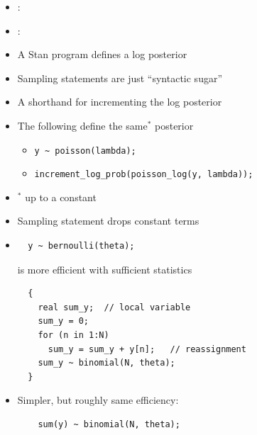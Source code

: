\documentclass[10pt]{report}
\begin{document}
%
\begin{itemize}
\item {}: \ {\footnotesize {}}
\item {}:
\ {\footnotesize
    }
\end{itemize}


%
\begin{itemize}
\item A Stan program defines a log posterior
\item Sampling statements are just ``syntactic sugar''
\item A shorthand for incrementing the log posterior
\item The following define the same$^*$ posterior
\begin{itemize}
\item \Verb|y ~ poisson(lambda);|
\item \Verb|increment_log_prob(poisson_log(y, lambda));|
\end{itemize}
\item ${}^{*}$ up to a constant
\item Sampling statement drops constant terms
\end{itemize}



%
\begin{itemize}
\item
\begin{Verbatim}
  y ~ bernoulli(theta);
\end{Verbatim}
is more efficient with sufficient statistics
{\small
\begin{Verbatim}
  {
    real sum_y;  // local variable
    sum_y = 0;
    for (n in 1:N)
      sum_y = sum_y + y[n];   // reassignment
    sum_y ~ binomial(N, theta);
  }
\end{Verbatim}
}
\item Simpler, but roughly same efficiency:
\begin{Verbatim}
    sum(y) ~ binomial(N, theta);
\end{Verbatim}
\end{itemize}
\end{document}
